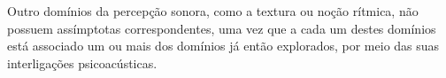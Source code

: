 \documentclass[../main.tex]{subfiles}
\begin{document}

Outro domínios da percepção sonora, como a textura ou noção rítmica, não possuem assímptotas correspondentes, uma vez que a cada um destes domínios está associado um ou mais dos domínios já então explorados, por meio das suas interligações psicoacústicas. 














\end{document}
